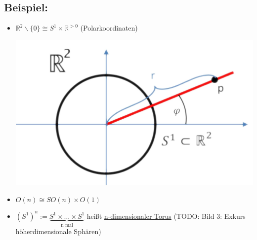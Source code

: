 \documentclass[a4paper,11pt,notitlepage]{report}
\theoremstyle{definition}
\newcommand{\R}{{\ensuremath{\mathbb{R}}}}
\newenvironment{bsp}[1]
{
\setlength{\fboxsep}{10pt}
\subsection*{Beispiel: #1}
\begin{upshape}
}
{
\end{upshape}
}
\begin{document}
\begin{bsp}{}
	\begin{itemize}
		\item $\R^2 \backslash \{0\} \cong S^1 \times \R^{> 0}$ (Polarkoordinaten) \newline
		\begin{center}		
			\includegraphics[scale=0.4]{images/Polarkoordinaten.png}
		\end{center}
		\item $O(n) \cong SO(n) \times O(1)$
		\item $(S^1)^n :=  \underbrace{S^1 \times \ldots \times S^1}_{\text{n mal}}$ heißt \underline{n-dimensionaler Torus} (TODO: Bild 3: Exkurs höherdimensionale Sphären)
	\end{itemize}
\end{bsp}
\end{document}
